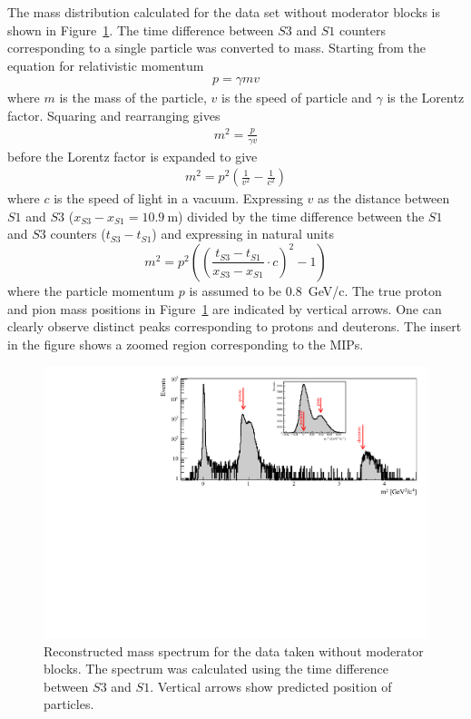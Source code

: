 The mass distribution calculated for the data set without moderator blocks is shown in Figure~\ref{fig:s3tof_mass}.
The time difference between $\mathit{S3}$ and $\mathit{S1}$ counters corresponding to a single particle was converted to mass.
Starting from the equation for relativistic momentum
\begin{align}
p = \gamma m v
\end{align}
where $m$ is the mass of the particle, $v$ is the speed of particle and $\gamma$ is the Lorentz factor.
Squaring and rearranging gives
\begin{align}
m^{2} = \frac{p}{\gamma v}
\end{align}
before the Lorentz factor is expanded to give
\begin{align}
m^{2} = p^{2}\left(\frac{1}{v^{2}} - \frac{1}{c^{2}}\right)
\end{align}
where $c$ is the speed of light in a vacuum. Expressing $v$ as the distance between $\mathit{S1}$ and $\mathit{S3}$ ($x_{\mathit{S3}}-x_{\mathit{S1}} = 10.9~\text{m}$) divided by the time difference between the $\mathit{S1}$ and $\mathit{S3}$ counters ($t_{\mathit{S3}} - t_{\mathit{S1}}$) and expressing in natural units 
\begin{equation} 
m^2 = p^2 \left( 
\left(\frac{t_{\mathit{S3}}-t_{\mathit{S1}}}{x_{\mathit{S3}}-x_{\mathit{S1}}} \cdot c \right)^2
- 1  \right)
\label{eq:recoMass}
\end{equation}
where the particle momentum $p$ is assumed to be 0.8~GeV/c.
The true proton and pion mass positions in Figure~\ref{fig:s3tof_mass} are indicated by vertical arrows.
One can clearly observe distinct peaks corresponding to protons and deuterons. 
The insert in the figure shows a zoomed region corresponding to the MIPs. 

\begin{figure}[h]
	\centering
	\includegraphics[width=0.9\linewidth]{files/Figures/Data_2018_8_31_b2_800MeV_0block_All.pdf}
	\caption{Reconstructed mass spectrum for the data taken without moderator blocks. The spectrum was calculated using the time difference between $\mathit{S3}$ and $\mathit{S1}$. Vertical arrows show predicted position of particles.}
	\label{fig:s3tof_mass}
\end{figure}

